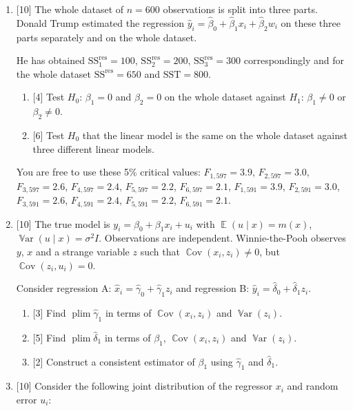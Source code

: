 \documentclass[12pt]{article}
\DeclareMathOperator{\Cov}{\mathbb{C}ov}
\DeclareMathOperator{\Var}{\mathbb{V}ar}
\DeclareMathOperator{\E}{\mathbb{E}}
\DeclareMathOperator{\plim}{plim}
\newcommand{\SST}{\text{SST}}
\newcommand{\SSR}{\text{SS}^{\text{res}}}
\newcommand{\hb}{\hat{\beta}}
\begin{document}
\begin{enumerate}
\item {[10]} The whole dataset of $n=600$ observations is split into three parts. 
Donald Trump estimated the regression $\hat y_i = \hb_0 + \hb_1 x_i + \hb_2 w_i$ on 
these three parts separately and on the whole dataset. 

He has obtained $\SSR_1 = 100$, $\SSR_2 = 200$, $\SSR_3 = 300$ correspondingly and for the whole dataset $\SSR = 650$ and $\SST = 800$. 

\begin{enumerate}
    \item {[4]} Test $H_0$: $\beta_1 = 0$ and $\beta_2 = 0$ on the whole dataset against $H_1$: $\beta_1 \neq 0$ or $\beta_2 \neq 0$.
    \item {[6]} Test $H_0$ that the linear model is the same on the whole dataset against three different linear models. 
\end{enumerate}

You are free to use these 5\% critical values: $F_{1, 597} =3.9$,  $F_{2, 597}=3.0$, $F_{3, 597}=2.6$, $F_{4, 597}=2.4$, $F_{5, 597}=2.2$, $F_{6, 597}=2.1$,
$F_{1, 591} =3.9$,  $F_{2, 591}=3.0$, $F_{3, 591}=2.6$, $F_{4, 591}=2.4$, $F_{5, 591}=2.2$, $F_{6, 591}=2.1$.

    
    \newpage
    
    \item {[10]} The true model is $y_i = \beta_0 + \beta_1 x_i + u_i$ with $\E(u \mid x) = m(x)$, $\Var(u \mid x) = \sigma^2 I$. 
    Observations are independent.
    Winnie-the-Pooh observes $y$, $x$ and a strange variable $z$ such that $\Cov(x_i, z_i) \neq 0$, but $\Cov(z_i, u_i) = 0$.

    Consider regression A: $\hat x_i = \hat \gamma_0 + \hat \gamma_1 z_i$ and regression B: $\hat y_i = \hat \delta_0 + \hat \delta_1 z_i$.

    \begin{enumerate}
        \item {[3]} Find $\plim \hat\gamma_1$ in terms of $\Cov(x_i, z_i)$ and $\Var(z_i)$.
        \item {[5]} Find $\plim \hat\delta_1$ in terms of $\beta_1$, $\Cov(x_i, z_i)$ and $\Var(z_i)$.
        \item {[2]} Construct a consistent estimator of $\beta_1$ using $\hat\gamma_1$ and $\hat\delta_1$. 
    \end{enumerate}


    \item {[10]} Consider the following joint distribution of the regressor $x_i$ and random error $u_i$:
    

\end{enumerate}
\end{document}
